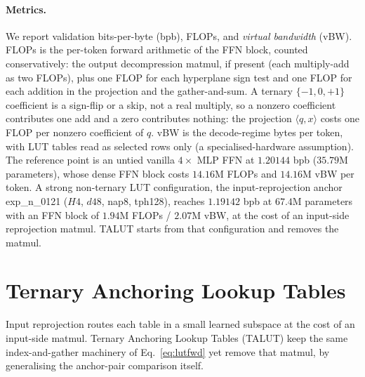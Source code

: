 \documentclass[11pt]{article}
\begin{document}
\paragraph{Metrics.} We report validation bits-per-byte (bpb), FLOPs, and \emph{virtual
bandwidth} (vBW). FLOPs is the per-token forward arithmetic of the FFN block, counted
conservatively: the output decompression matmul, if present (each multiply-add as two FLOPs),
plus one FLOP for each hyperplane sign test and one FLOP for each addition in the projection and
the gather-and-sum. A ternary $\{-1,0,+1\}$ coefficient is a sign-flip or a skip, not a real
multiply, so a nonzero coefficient contributes one add and a zero contributes nothing: the
projection $\langle q,x\rangle$ costs one FLOP per nonzero coefficient of $q$. vBW is the
decode-regime bytes per token, with LUT tables read as selected rows only (a specialised-hardware
assumption). The reference point is an untied vanilla $4\times$ MLP FFN at $1.20144$ bpb
($35.79$M parameters), whose dense FFN block costs $14.16$M FLOPs and $14.16$M vBW per token. A
strong non-ternary LUT configuration, the input-reprojection anchor exp\_n\_0121 ($H4$, $d48$,
nap8, tph128), reaches $1.19142$ bpb at $67.4$M parameters with an FFN block of $1.94$M FLOPs /
$2.07$M vBW, at the cost of an input-side reprojection matmul. TALUT starts from that
configuration and removes the matmul.

\section{Ternary Anchoring Lookup Tables}
\label{sec:talut}
Input reprojection routes each table in a small learned subspace at the cost of an input-side
matmul. Ternary Anchoring Lookup Tables (TALUT) keep the same index-and-gather machinery of
Eq.~\eqref{eq:lutfwd} yet remove that matmul, by generalising the anchor-pair comparison itself.
\end{document}
